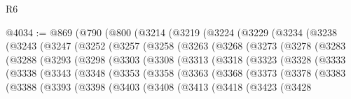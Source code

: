 \begin{lexlean}{R6}
\begin{coremodule}
@4034 := @869
    (@790
      (@800
        (@3214
          (@3219
            (@3224
              (@3229
                (@3234
                  (@3238
                    (@3243
                      (@3247
                        (@3252
                          (@3257
                            (@3258
                              (@3263
                                (@3268
                                  (@3273
                                    (@3278
                                      (@3283
                                        (@3288
                                          (@3293
                                            (@3298
                                              (@3303
                                                (@3308
                                                  (@3313
                                                    (@3318
                                                      (@3323
                                                        (@3328
                                                          (@3333
                                                            (@3338
                                                              (@3343
                                                                (@3348
                                                                  (@3353
                                                                    (@3358
                                                                      (@3363
                                                                        (@3368
                                                                          (@3373
                                                                            (@3378
                                                                              (@3383
                                                                                (@3388
                                                                                  (@3393
                                                                                    (@3398
                                                                                      (@3403
                                                                                        (@3408
                                                                                          (@3413
                                                                                            (@3418
                                                                                              (@3423
                                                                                                (@3428

\end{coremodule}
\end{lexlean}
